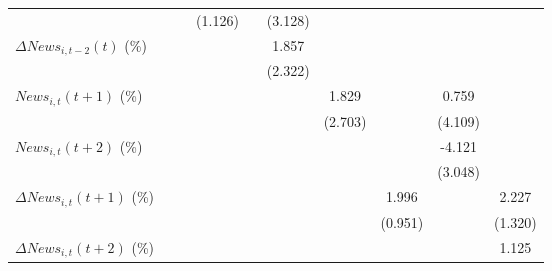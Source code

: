 {\begin{tabular}{l*{9}{c}}
                    &                     &                     &     (1.126)         &                     &     (3.128)         &                     &                     &                     &                     \\
\addlinespace
$ \Delta News_{i,t-2}(t)$ (\%)&                     &                     &                     &                     &       1.857         &                     &                     &                     &                     \\
                    &                     &                     &                     &                     &     (2.322)         &                     &                     &                     &                     \\
\addlinespace
$ News_{i,t}(t+1)$ (\%)&                     &                     &                     &                     &                     &       1.829         &                     &       0.759         &                     \\
                    &                     &                     &                     &                     &                     &     (2.703)         &                     &     (4.109)         &                     \\
\addlinespace
$ News_{i,t}(t+2)$ (\%)&                     &                     &                     &                     &                     &                     &                     &      -4.121         &                     \\
                    &                     &                     &                     &                     &                     &                     &                     &     (3.048)         &                     \\
\addlinespace
$ \Delta News_{i,t}(t+1)$ (\%)&                     &                     &                     &                     &                     &                     &       1.996\sym{**} &                     &       2.227\sym{*}  \\
                    &                     &                     &                     &                     &                     &                     &     (0.951)         &                     &     (1.320)         \\
\addlinespace
$ \Delta News_{i,t}(t+2)$ (\%)&                     &                     &                     &                     &                     &                     &                     &                     &       1.125         \\

\end{tabular}}
